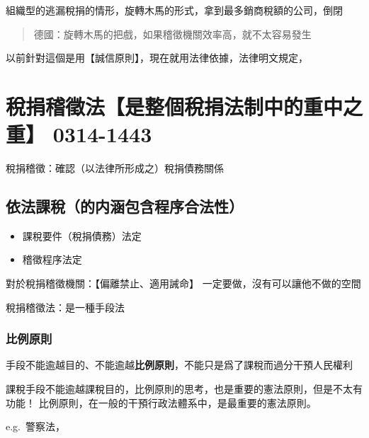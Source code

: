 \documentclass[]{ctexbook}
\providecommand{\tightlist}{%
  \setlength{\itemsep}{0pt}\setlength{\parskip}{0pt}}
\begin{document}
組織型的逃漏稅捐的情形，旋轉木馬的形式，拿到最多銷商稅額的公司，倒閉

\begin{quote}
德國：旋轉木馬的把戲，如果稽徵機關效率高，就不太容易發生
\end{quote}

以前針對這個是用【誠信原則】，現在就用法律依據，法律明文規定，

\hypertarget{ux7a05ux6350ux7a3dux5fb5ux6cd5ux662fux6574ux500bux7a05ux6350ux6cd5ux5236ux4e2dux7684ux91cdux4e2dux4e4bux91cd-0314-1443}{%
\chapter{稅捐稽徵法【是整個稅捐法制中的重中之重】 0314-1443}\label{ux7a05ux6350ux7a3dux5fb5ux6cd5ux662fux6574ux500bux7a05ux6350ux6cd5ux5236ux4e2dux7684ux91cdux4e2dux4e4bux91cd-0314-1443}}

稅捐稽徵：確認（以法律所形成之）稅捐債務關係

\hypertarget{ux4f9dux6cd5ux8ab2ux7a05ux7684ux5185ux6db5ux5305ux542bux7a0bux5e8fux5408ux6cd5ux6027}{%
\section{\texorpdfstring{\textbf{依法課稅}（的内涵包含程序合法性）}{依法課稅（的内涵包含程序合法性）}}\label{ux4f9dux6cd5ux8ab2ux7a05ux7684ux5185ux6db5ux5305ux542bux7a0bux5e8fux5408ux6cd5ux6027}}

\begin{itemize}
\tightlist
\item
  課稅要件（稅捐債務）法定
\item
  稽徵程序法定
\end{itemize}

對於稅捐稽徵機關：【偏離禁止、適用誡命】
一定要做，沒有可以讓他不做的空間

稅捐稽徵法：是一種手段法

\hypertarget{ux6bd4ux4f8bux539fux5247}{%
\subsection{比例原則}\label{ux6bd4ux4f8bux539fux5247}}

手段不能逾越目的、不能逾越\textbf{比例原則}，不能只是爲了課稅而過分干預人民權利

課稅手段不能逾越課稅目的，比例原則的思考，也是重要的憲法原則，但是不太有功能！
比例原則，在一般的干預行政法體系中，是最重要的憲法原則。

e.g.~警察法，
\end{document}
